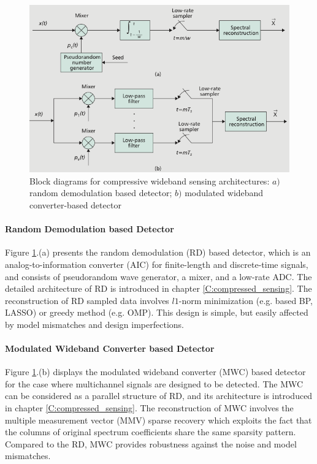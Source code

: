 \begin{figure}
\centering
\includegraphics[width=0.75\columnwidth]{figs/comp_spec_sens.png}
\caption{Block diagrams for compressive wideband sensing architectures: $a)$ random demodulation based detector; $b)$ modulated wideband converter-based detector}
\label{comp_spec_sens}
\end{figure} 

\paragraph{Random Demodulation based Detector}  Figure \ref{comp_spec_sens}.(a) presents the random demodulation (RD) based detector\cite{tropp2010beyond}, which is an analog-to-information converter (AIC) for finite-length and discrete-time signals, and consists of pseudorandom wave generator, a mixer, and a low-rate ADC. The detailed architecture of RD is introduced in chapter \ref{C:compressed_sensing}. The reconstruction of RD sampled data involves $l1$-norm minimization (e.g. based BP, LASSO) or greedy method (e.g. OMP).
This design is simple, but easily affected by model mismatches and design imperfections.

\paragraph{Modulated Wideband Converter based Detector}
Figure \ref{comp_spec_sens}.(b) displays the modulated wideband converter (MWC) based detector \cite{mishali2009expected} for the case where multichannel signals are designed to be detected. The MWC can be considered as a parallel structure of RD, and its architecture is introduced in chapter \ref{C:compressed_sensing}. The reconstruction of MWC involves the multiple measurement vector (MMV) sparse recovery which exploits the fact that the columns of original spectrum coefficients share the same sparsity pattern. Compared to the RD, MWC provides robustness against the noise and model mismatches.


